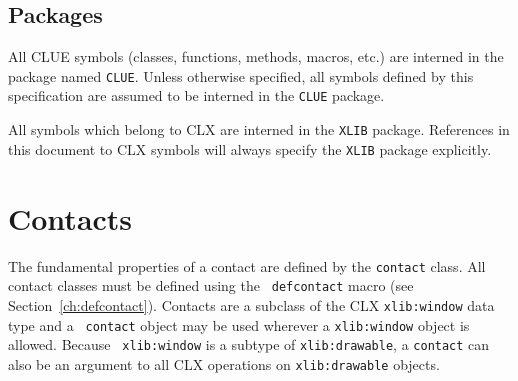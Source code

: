 \section{Packages}
All CLUE symbols (classes, functions, methods, macros, etc.) are interned in 
the package named {\tt CLUE}. Unless otherwise specified, all symbols defined by 
this specification are assumed to be interned in the {\tt CLUE} package.

All symbols which belong to CLX are interned in the {\tt XLIB} package.
References in this document to CLX symbols will always specify the {\tt XLIB}
package explicitly.





\chapter{Contacts}

The fundamental properties of a contact are defined by the {\tt contact} class.
All contact classes must be defined using the {\tt
defcontact} macro (see Section~\ref{ch:defcontact}).
Contacts are a subclass of the CLX {\tt xlib:window} data type and a {\tt
contact}
object may be used wherever a {\tt xlib:window} object is allowed. Because {\tt
xlib:window} is a subtype of {\tt xlib:drawable}, a {\tt contact} can also be an
argument to all CLX operations on {\tt xlib:drawable} objects.

